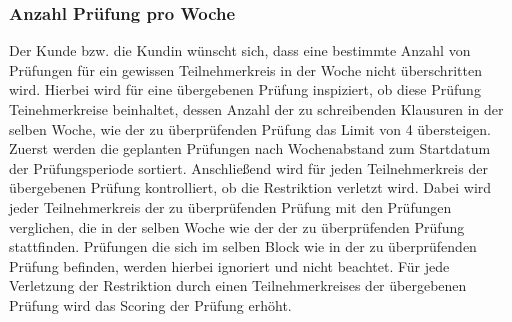\subsubsection{Anzahl Prüfung pro Woche}
Der Kunde bzw. die Kundin wünscht sich,
dass eine bestimmte Anzahl von Prüfungen für ein gewissen Teilnehmerkreis
in der Woche nicht überschritten wird.
Hierbei wird für eine übergebenen Prüfung inspiziert,
ob diese Prüfung Teinehmerkreise beinhaltet, dessen Anzahl der zu schreibenden Klausuren in der selben Woche,
wie der zu überprüfenden Prüfung das Limit von 4 übersteigen.
Zuerst werden die geplanten Prüfungen nach Wochenabstand zum Startdatum der Prüfungsperiode sortiert.
Anschließend wird für jeden Teilnehmerkreis der übergebenen Prüfung kontrolliert,
ob die Restriktion verletzt wird.
Dabei wird jeder Teilnehmerkreis der zu überprüfenden Prüfung mit
den Prüfungen verglichen, die in der selben Woche wie der der zu überprüfenden Prüfung stattfinden.
Prüfungen die sich im selben Block wie in der zu überprüfenden Prüfung befinden,
werden hierbei ignoriert und nicht beachtet.
Für jede Verletzung der Restriktion durch einen Teilnehmerkreises der übergebenen Prüfung wird das Scoring der Prüfung erhöht.




